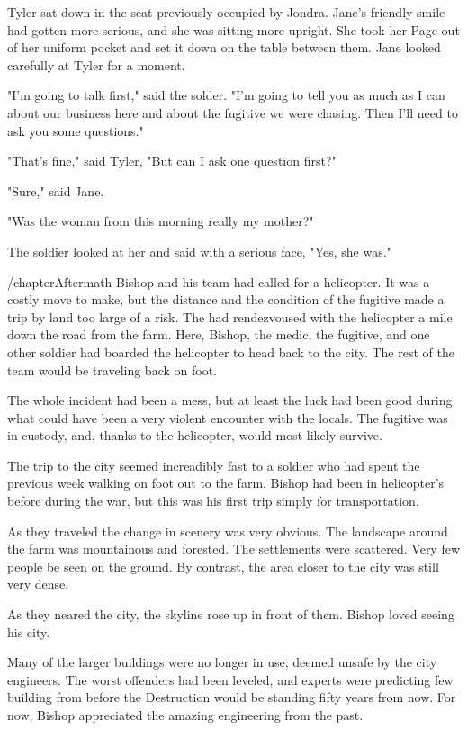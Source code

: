 \documentclass[courier]{sffms}
\begin{document}
Tyler sat down in the seat previously
occupied by Jondra. Jane's friendly smile
had gotten more serious, and she was 
sitting more upright. She took her Page
out of her uniform pocket and set it
down on the table between them. Jane
looked carefully at Tyler for a moment.

"I'm going to talk first," said the solder.
"I'm going to tell you as much as I can
about our business here and about the
fugitive we were chasing. Then I'll need
to ask you some questions."

"That's fine," said Tyler, "But can I ask
one question first?"

"Sure," said Jane.

"Was the woman from this morning really
my mother?"

The soldier looked at her and said with a serious
face, "Yes, she was."

/chapter{Aftermath}
Bishop and his team had called for a helicopter.
It was a costly move to make, but the distance
and the condition of the fugitive made a trip
by land too large of a risk. The had rendezvoused
with the helicopter a mile down the road from the
farm. Here, Bishop, the medic, the fugitive, and
one other soldier had boarded the helicopter
to head back to the city. The rest of the team
would be traveling back on foot.

The whole incident had been a mess, but at
least the luck had been good during what
could have been a very violent encounter with
the locals. The fugitive was in custody, and,
thanks to the helicopter, would most likely
survive.

The trip to the city seemed increadibly fast to
a soldier who had spent the previous week
walking on foot out to the farm. Bishop had
been in helicopter's before during the war,
but this was his first trip simply for transportation.

As they traveled the change in scenery was
very obvious. The landscape around the
farm was mountainous and forested. The
settlements were scattered. Very few people
be seen on the ground. By contrast, the area
closer to the city was still very dense.

As they neared the city, the skyline rose up
in front of them. Bishop loved seeing his city.

Many of the larger buildings were no longer
in use; deemed unsafe by the city engineers.
The worst offenders had been leveled, and
experts were predicting few building from
before the Destruction would be standing
fifty years from now. For now, Bishop
appreciated the amazing engineering from the past.
\end{document}
